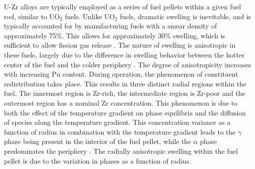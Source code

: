 \documentclass[review]{elsarticle}
\begin{document}
U-Zr alloys are typically employed as a series of fuel pellets within a given fuel rod, similar to UO$_{2}$ fuels. Unlike UO$_{2}$ fuels, dramatic swelling is inevitable, and is typically accounted for by manufacturing fuels with a smear density of approximately 75{\%}. This allows for approximately 30\% swelling, which is sufficient to allow fission gas release \cite{beck1968}. The nature of swelling is anisotropic in these fuels, largely due to the difference in swelling behavior between the hotter center of the fuel and the colder periphery \cite{hofman1990}. The degree of anisotropicity increases with increasing Pu content. During operation, the phenomenon of constituent redistribution takes place. This results in three distinct radial regions within the fuel. The innermost region is Zr-rich, the intermediate region is Zr-poor and the outermost region has a nominal Zr concentration. This phenomenon is due to both the effect of the temperature gradient on phase equilibria and the diffusion of species along the temperature gradient. This concentration variance as a function of radius in combination with the temperature gradient leads to the $\gamma$ phase being present in the interior of the fuel pellet, while the $\alpha$ phase predominates the periphery \cite{kobayashi1990, kim2004}. The radially anisotropic swelling within the fuel pellet is due to the variation in phases as a function of radius.
\end{document}
